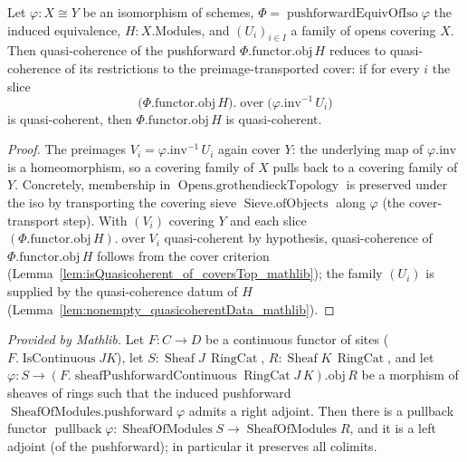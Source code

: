 \begin{lemma}
  \label{lem:pushforward_iso_qcoh_of_slice_qcoh}
  Let \(\varphi : X \cong Y\) be an isomorphism of schemes,
  \(\Phi = \operatorname{pushforwardEquivOfIso}\varphi\) the induced equivalence, \(H :
  X.\mathrm{Modules}\), and \((U_i)_{i \in I}\) a family of opens covering \(X\). Then quasi-coherence
  of the pushforward \(\Phi.\mathrm{functor}.\mathrm{obj}\, H\) reduces to quasi-coherence of its
  restrictions to the preimage-transported cover: if for every \(i\) the slice
  \[
    \bigl(\Phi.\mathrm{functor}.\mathrm{obj}\, H\bigr).\operatorname{over}
      \bigl(\varphi.\mathrm{inv}^{-1}\,U_i\bigr)
  \]
  is quasi-coherent, then \(\Phi.\mathrm{functor}.\mathrm{obj}\, H\) is quasi-coherent.
\end{lemma}
\begin{proof}
  The preimages \(V_i = \varphi.\mathrm{inv}^{-1}\,U_i\) again cover \(Y\): the underlying map of
  \(\varphi.\mathrm{inv}\) is a homeomorphism, so a covering family of \(X\) pulls back to a covering
  family of \(Y\). Concretely, membership in \(\operatorname{Opens.grothendieckTopology}\) is preserved
  under the iso by transporting the covering sieve \(\operatorname{Sieve.ofObjects}\) along
  \(\varphi\) (the cover-transport step). With \((V_i)\) covering \(Y\) and each slice
  \((\Phi.\mathrm{functor}.\mathrm{obj}\, H).\operatorname{over} V_i\) quasi-coherent by hypothesis,
  quasi-coherence of \(\Phi.\mathrm{functor}.\mathrm{obj}\, H\) follows from the cover criterion
  (Lemma~\ref{lem:isQuasicoherent_of_coversTop_mathlib}); the family \((U_i)\) is supplied by the
  quasi-coherence datum of \(H\) (Lemma~\ref{lem:nonempty_quasicoherentData_mathlib}).
\end{proof}

\begin{lemma}
  \label{lem:sheafOfModules_pullback_mathlib}
  \mathlibok
  \textit{Provided by Mathlib.}
  Let \(F : C \to D\) be a continuous functor of sites (\(F.\operatorname{IsContinuous} J K\)), let
  \(S : \operatorname{Sheaf} J\,\operatorname{RingCat}\), \(R : \operatorname{Sheaf}
  K\,\operatorname{RingCat}\), and let \(\varphi : S \to (F.\operatorname{sheafPushforwardContinuous}
  \operatorname{RingCat} J\,K).\mathrm{obj}\, R\) be a morphism of sheaves of rings such that the induced
  pushforward \(\operatorname{SheafOfModules.pushforward}\varphi\) admits a right adjoint. Then there is a
  pullback functor \(\operatorname{pullback}\varphi : \operatorname{SheafOfModules} S \to
  \operatorname{SheafOfModules} R\), and it is a left adjoint (of the pushforward); in particular it
  preserves all colimits.
\end{lemma}


